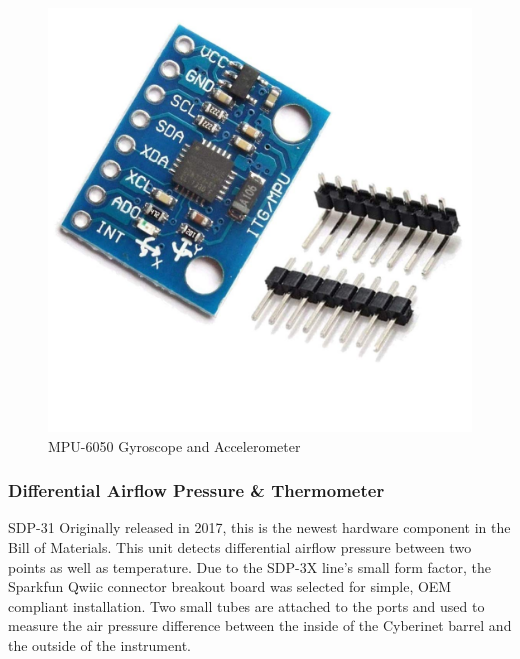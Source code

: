 \begin{center}
    \begin{figure}
        \centering
        \includegraphics[scale=0.2]{diagrams/oem/6050.jpg}
        \caption{MPU-6050 Gyroscope and Accelerometer}
        \label{fig:6050}
    \end{figure}
\end{center}


\subsubsection{Differential Airflow Pressure \& Thermometer}

SDP-31
Originally released in 2017, this is the newest hardware component in the Bill of Materials. This unit detects differential airflow pressure between two points as well as temperature. Due to the SDP-3X line’s small form factor, the Sparkfun Qwiic connector breakout board was selected for simple, OEM compliant installation. Two small tubes are attached to the ports and used to measure the air pressure difference between the inside of the Cyberinet barrel and the outside of the instrument.

